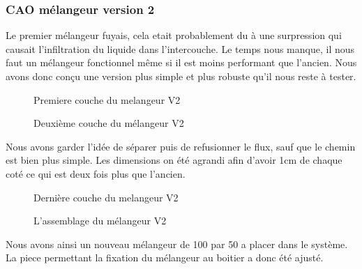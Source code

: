\documentclass[a4paper, 11pt]{article}
\begin{document}
\subsubsection{CAO mélangeur version 2}
Le premier mélangeur fuyais, cela etait probablement du à une surpression qui causait
l'infiltration du liquide dans l'intercouche. 
Le temps nous manque, il nous faut un mélangeur fonctionnel même si il est moins performant que l'ancien.
Nous avons donc conçu une version plus simple et plus robuste qu'il nous reste à tester.
\begin{multicols}{2}
    \begin{figure}[H]
        \centering
        \caption{Premiere couche du melangeur V2}
        \label{fig: CAO_melangeur_V2_couche1}
    \end{figure}
    \begin{figure}[H]
        \centering
        \caption{Deuxième couche du mélangeur V2}
        \label{fig:CAO_melangeur_V2_couche2}
    \end{figure}
\end{multicols}
Nous avons garder l'idée de séparer puis de refusionner le flux, sauf que le chemin est bien plus simple.
Les dimensions on été agrandi afin d'avoir 1cm de chaque coté ce qui est deux fois plus que l'ancien.
\begin{multicols}{2}
    \begin{figure}[H]
        \centering
        \caption{Dernière couche du melangeur V2}
        \label{fig: CAO_melangeur_V2_couche3}
    \end{figure}
    \begin{figure}[H]
        \centering
        \caption{L'assemblage du mélangeur V2}
        \label{fig:CAO_melangeur_V2}
    \end{figure}
\end{multicols}
Nous avons ainsi un nouveau mélangeur de 100 par 50 a placer dans le système. La piece permettant la fixation du mélangeur 
au boitier a donc été ajusté.
\end{document}
